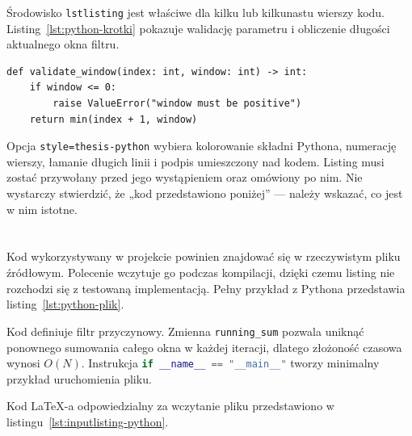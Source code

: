 Środowisko \texttt{lstlisting} jest właściwe dla kilku lub kilkunastu wierszy kodu.
Listing~\ref{lst:python-krotki} pokazuje walidację parametru i obliczenie długości
aktualnego okna filtru.

\begin{lstlisting}[style=thesis-python,caption={Walidacja szerokości okna filtru},label={lst:python-krotki}]
def validate_window(index: int, window: int) -> int:
    if window <= 0:
        raise ValueError("window must be positive")
    return min(index + 1, window)
\end{lstlisting}

Opcja \texttt{style=thesis-python} wybiera kolorowanie składni Pythona, numerację
wierszy, łamanie długich linii i podpis umieszczony nad kodem. Listing musi zostać
przywołany przed jego wystąpieniem oraz omówiony po nim. Nie wystarczy stwierdzić,
że „kod przedstawiono poniżej” --- należy wskazać, co jest w nim istotne.

\section{}

Kod wykorzystywany w projekcie powinien znajdować się w rzeczywistym pliku źródłowym.
Polecenie \verb|| wczytuje go podczas kompilacji, dzięki czemu listing
nie rozchodzi się z testowaną implementacją. Pełny przykład z Pythona przedstawia
listing~\ref{lst:python-plik}.



Kod definiuje filtr przyczynowy. Zmienna \lstinline[language=Python]|running_sum|
pozwala uniknąć ponownego sumowania całego okna w każdej iteracji, dlatego złożoność
czasowa wynosi $O(N)$. Instrukcja \lstinline[language=Python]|if __name__ == "__main__"|
tworzy minimalny przykład uruchomienia pliku.

Kod LaTeX-a odpowiedzialny za wczytanie pliku przedstawiono w
listingu~\ref{lst:inputlisting-python}.

\begin{lstlisting}[style=thesis,caption={Wczytanie kodu z zewnętrznego pliku},label={lst:inputlisting-python}]

\end{lstlisting}

